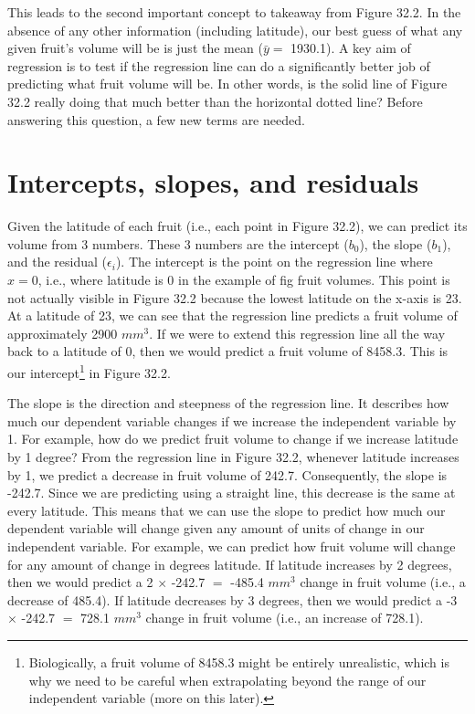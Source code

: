 \documentclass[
  openany]{krantz}
\begin{document}
This leads to the second important concept to takeaway from Figure 32.2.
In the absence of any other information (including latitude), our best guess of what any given fruit's volume will be is just the mean (\(\bar{y} =\) 1930.1).
A key aim of regression is to test if the regression line can do a significantly better job of predicting what fruit volume will be.
In other words, is the solid line of Figure 32.2 really doing that much better than the horizontal dotted line?
Before answering this question, a few new terms are needed.

\hypertarget{intercepts-slopes-and-residuals}{%
\section{Intercepts, slopes, and residuals}\label{intercepts-slopes-and-residuals}}

Given the latitude of each fruit (i.e., each point in Figure 32.2), we can predict its volume from 3 numbers.
These 3 numbers are the intercept (\(b_{0}\)), the slope (\(b_{1}\)), and the residual (\(\epsilon_{i}\)).
The intercept is the point on the regression line where \(x = 0\), i.e., where latitude is 0 in the example of fig fruit volumes.
This point is not actually visible in Figure 32.2 because the lowest latitude on the x-axis is 23.
At a latitude of 23, we can see that the regression line predicts a fruit volume of approximately 2900 \(mm^{3}\).
If we were to extend this regression line all the way back to a latitude of 0, then we would predict a fruit volume of 8458.3.
This is our intercept\footnote{Biologically, a fruit volume of 8458.3 might be entirely unrealistic, which is why we need to be careful when extrapolating beyond the range of our independent variable (more on this later).} in Figure 32.2.

The slope is the direction and steepness of the regression line.
It describes how much our dependent variable changes if we increase the independent variable by 1.
For example, how do we predict fruit volume to change if we increase latitude by 1 degree?
From the regression line in Figure 32.2, whenever latitude increases by 1, we predict a decrease in fruit volume of 242.7.
Consequently, the slope is -242.7.
Since we are predicting using a straight line, this decrease is the same at every latitude.
This means that we can use the slope to predict how much our dependent variable will change given any amount of units of change in our independent variable.
For example, we can predict how fruit volume will change for any amount of change in degrees latitude.
If latitude increases by 2 degrees, then we would predict a 2 \(\times\) -242.7 \(=\) -485.4 \(mm^{3}\) change in fruit volume (i.e., a decrease of 485.4).
If latitude decreases by 3 degrees, then we would predict a -3 \(\times\) -242.7 \(=\) 728.1 \(mm^{3}\) change in fruit volume (i.e., an increase of 728.1).
\end{document}
